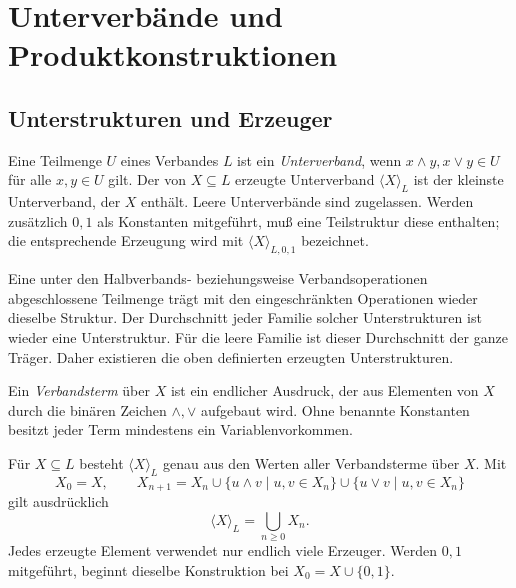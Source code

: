 \chapter{Unterverbände und Produktkonstruktionen}
\label{b45guide:ch:constructions}

\section{Unterstrukturen und Erzeuger}

\begin{definition}
\label{b45guide:def:sublattice}
Eine Teilmenge $U$ eines Verbandes $L$ ist ein \emph{Unterverband},
wenn $x\wedge y,x\vee y\in U$ für alle $x,y\in U$ gilt.
Der von $X\subseteq L$ erzeugte Unterverband $\langle X\rangle_L$
ist der kleinste Unterverband, der $X$ enthält.
Leere Unterverbände sind zugelassen. Werden zusätzlich $0,1$
als Konstanten mitgeführt, muß eine Teilstruktur diese enthalten;
die entsprechende Erzeugung wird mit $\langle X\rangle_{L,0,1}$ bezeichnet.
\end{definition}

\begin{theorem}
\label{b45guide:thm:closure}
Eine unter den Halbverbands- beziehungsweise Verbandsoperationen
abgeschlossene Teilmenge trägt mit den eingeschränkten Operationen
wieder dieselbe Struktur. Der Durchschnitt jeder Familie solcher
Unterstrukturen ist wieder eine Unterstruktur.
Für die leere Familie ist dieser Durchschnitt der ganze Träger.
Daher existieren die oben definierten erzeugten Unterstrukturen.
\cite{supclosed}
\end{theorem}

\begin{definition}[Verbandsterme]
Ein \emph{Verbandsterm} über $X$ ist ein endlicher Ausdruck, der
aus Elementen von $X$ durch die binären Zeichen $\wedge,\vee$
aufgebaut wird. Ohne benannte Konstanten besitzt jeder Term
mindestens ein Variablenvorkommen.
\end{definition}

\begin{theorem}
\label{b45guide:thm:lattice-generation}
Für $X\subseteq L$ besteht $\langle X\rangle_L$ genau aus den
Werten aller Verbandsterme über $X$.
Mit
\[
 X_0=X,\qquad
 X_{n+1}=X_n\cup\{u\wedge v\mid u,v\in X_n\}
                 \cup\{u\vee v\mid u,v\in X_n\}
\]
gilt ausdrücklich
\[
 \langle X\rangle_L=\bigcup_{n\geq0}X_n.
\]
Jedes erzeugte Element verwendet nur endlich viele Erzeuger.
Werden $0,1$ mitgeführt, beginnt dieselbe Konstruktion bei
$X_0=X\cup\{0,1\}$. \cite{supclosed}
\end{theorem}

